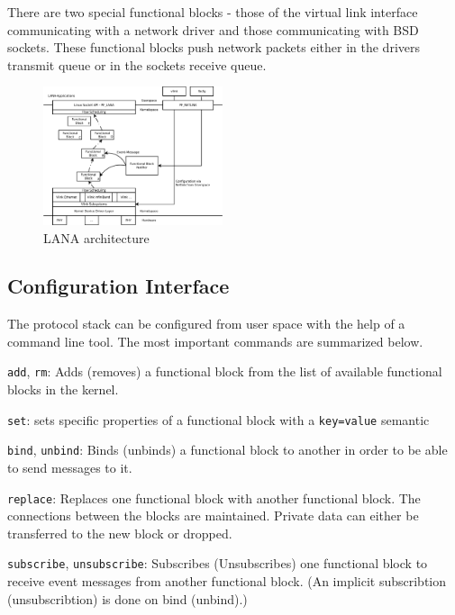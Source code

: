 \documentclass{sig-alternate}
\begin{document}
There are two special functional blocks - those of the virtual link interface 
communicating with a network driver and those communicating with BSD sockets.
These functional blocks push network packets either in the drivers transmit 
queue or in the sockets receive queue. 

\begin{figure}
\centering
\includegraphics[width=0.47\textwidth]{figures/architecture.pdf}
\caption{LANA architecture}
\label{fig:architecture}
\end{figure}


\subsection{Configuration Interface}
The protocol stack can be configured from user space with the help of a 
command line tool. The most important commands are summarized below.
\begin{compactitem}
\item \texttt{add}, \texttt{rm}: Adds (removes) a functional block from the 
      list of available functional blocks in the kernel. 
\item \texttt{set}: sets specific properties of a functional block with a 
      \texttt{key=value} semantic
\item \texttt{bind}, \texttt{unbind}: Binds (unbinds) a functional block 
      to another in order to be able to send messages to it. 
\item \texttt{replace}: Replaces one functional block with another 
      functional block. The connections between the blocks are maintained. 
      Private data can either be transferred to the new block or dropped.
\item \texttt{subscribe}, \texttt{unsubscribe}: Subscribes (Unsubscribes) one 
      functional block to receive event messages from another functional block.
      (An implicit subscribtion (unsubscribtion) is done on bind (unbind).)
\end{compactitem}
\end{document}
